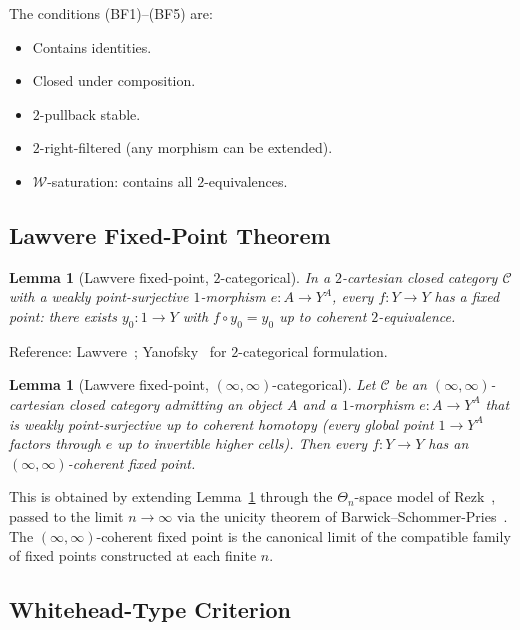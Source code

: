 \documentclass[11pt]{article}
\theoremstyle{plain}
\newtheorem{lemma}[theorem]{Lemma}
\theoremstyle{definition}
\newcommand{\cC}{\mathcal{C}}
\begin{document}
The conditions (BF1)--(BF5) are:
\begin{itemize}
\item[\textbf{(BF1)}] Contains identities.
\item[\textbf{(BF2)}] Closed under composition.
\item[\textbf{(BF3)}] $2$-pullback stable.
\item[\textbf{(BF4)}] $2$-right-filtered (any morphism can be extended).
\item[\textbf{(BF5)}] $\mathcal{W}$-saturation: contains all $2$-equivalences.
\end{itemize}

\subsection{Lawvere Fixed-Point Theorem}

\begin{lemma}[Lawvere fixed-point, $2$-categorical]\label{lem:lawvere-2}
In a $2$-cartesian closed category $\cC$ with a weakly point-surjective $1$-morphism $e : A \to Y^A$, every $f : Y \to Y$ has a fixed point: there exists $y_0 : 1 \to Y$ with $f \circ y_0 = y_0$ up to coherent $2$-equivalence.
\end{lemma}

Reference: Lawvere~\cite{Lawvere1969}; Yanofsky~\cite{Yanofsky2003} for $2$-categorical formulation.

\begin{lemma}[Lawvere fixed-point, $(\infty, \infty)$-categorical]\label{lem:lawvere-inf}
Let $\cC$ be an $(\infty, \infty)$-cartesian closed category admitting an object $A$ and a $1$-morphism $e : A \to Y^A$ that is \emph{weakly point-surjective up to coherent homotopy} (every global point $1 \to Y^A$ factors through $e$ up to invertible higher cells). Then every $f : Y \to Y$ has an $(\infty, \infty)$-coherent fixed point.
\end{lemma}

This is obtained by extending Lemma~\ref{lem:lawvere-2} through the $\Theta_n$-space model of Rezk~\cite{Rezk2010}, passed to the limit $n \to \infty$ via the unicity theorem of Barwick--Schommer-Pries~\cite{BarwickSchommerPries2021}. The $(\infty, \infty)$-coherent fixed point is the canonical limit of the compatible family of fixed points constructed at each finite $n$.

\subsection{Whitehead-Type Criterion}
\end{document}
